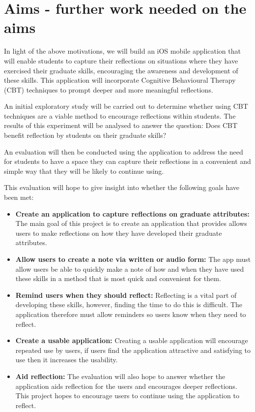 \documentclass{l4proj}
\begin{document}
\section{Aims - further work needed on the aims}
In light of the above motivations, we will build an iOS mobile application that will enable students to capture their reflections on situations where they have exercised their graduate skills, encouraging the awareness and development of these skills. This application will incorporate Cognitive Behavioural Therapy (CBT) techniques to prompt deeper and more meaningful reflections. 

An initial exploratory study will be carried out to determine whether using CBT techniques are a viable method to encourage reflections within students. The results of this experiment will be analysed to answer the question: Does CBT benefit reflection by students on their graduate skills?

An evaluation will then be conducted using the application to address the need for students to have a space they can capture their reflections in a convenient and simple way that they will be likely to continue using. 
 
This evaluation will hope to give insight into whether the following goals have been met:
\begin{itemize}
    \item \textbf{Create an application to capture reflections on graduate attributes:} The
    main goal of this project is to create an application that provides allows 
    users to make reflections on how they have developed their graduate attributes.
    \item \textbf{Allow users to create a note via written or audio form:} The app must 
    allow users be able to quickly make a note of how and when they have used these 
    skills in a method that is most quick and convenient for them.
    \item \textbf{Remind users when they should reflect:} Reflecting is a vital part of developing these
    skills, however, finding the time to do this is difficult. The application therefore
    must allow reminders so users know when they need to reflect.
    \item \textbf{Create a usable application:} Creating a usable application will 
    encourage repeated use by users, if users find the application attractive and satisfying
    to use then it increases the usability.
    \item \textbf{Aid reflection:} The evaluation will also hope to answer whether the 
    application aids reflection for the users and encourages deeper reflections. This 
    project hopes to encourage users to continue using the application to reflect.
\end{itemize}
\end{document}
